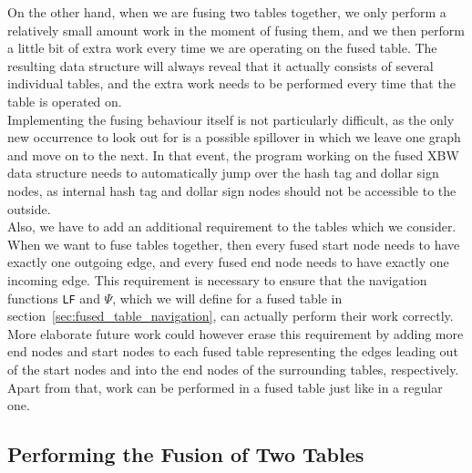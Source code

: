 \documentclass[a4paper,12pt,twoside,BCOR=10mm]{scrbook}
\begin{document}
On the other hand, when we are fusing two tables together,
we only perform a relatively small amount work in the moment of fusing them,
and we then perform a little bit of extra work every time we are operating on the fused table.
The resulting data structure will always reveal that it actually consists of several
individual tables, and the extra work needs to be performed every time that the table is operated on. \\
Implementing the fusing behaviour itself is not particularly difficult,
as the only new occurrence to look out for is a possible spillover in which
we leave one graph and move on to the next. In that event, the program working
on the fused XBW data structure needs to automatically jump over the hash tag and dollar sign nodes,
as internal hash tag and dollar sign nodes should not be accessible to the outside. \\
Also, we have to add an additional requirement to the tables which we consider.
When we want to fuse tables together, then every fused start node needs to have
exactly one outgoing edge, and every fused end node needs to have exactly one incoming edge.
This requirement is necessary to ensure that the navigation functions \texttt{LF} and $\Psi$,
which we will define for a fused table
in section~\ref{sec:fused_table_navigation}, can actually perform their work correctly.
More elaborate future work could however erase this requirement by adding more end nodes and start nodes
to each fused table representing the edges leading out of the start nodes and into the end nodes of the surrounding tables,
respectively. \\
Apart from that, work can be performed in a fused table just like in a regular one.

\subsection{Performing the Fusion of Two Tables}
\label{sec:perform_fusion_of_two_tables}
\end{document}
